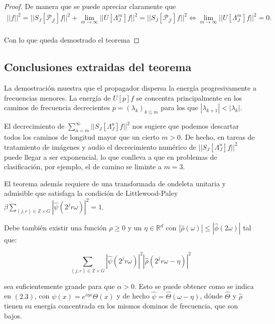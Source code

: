 \begin{proof}
  \noindent De manera que se puede apreciar claramente que  
  \begin{align*}
    ||f||^2 =||S_J[\mathcal{P_J}]f||^2 + \lim_{m\rightarrow \infty} ||U[\Lambda_J^m]f||^2  = ||S_J[\mathcal{P_J}]f||^2 \iff \lim_{m\rightarrow \infty} ||U[\Lambda_J^m]f||^2=0. \\
  \end{align*}

  \noindent Con lo que queda demostrado el teorema \qedhere
\end{proof}

\subsection{Conclusiones extraidas del teorema}
\noindent La demostración muestra que el propagador dispersa la energía progresivamente a frecuencias menores. La energía de $U[p]f$ se concentra principalmente en los caminos de frecuencia decrecientes $p=(\lambda_k)_{k\leq m}$ para los que $|\lambda_{k+1}|<|\lambda_k|$.


\medskip

\noindent El decrecimiento de $\sum_{n=m}^\infty || S_J[\Lambda_J^n]f||^2$ nos sugiere que podemos descartar todos los caminos de longitud mayor que un cierto $m>0$. De hecho, en tareas de tratamiento de imágenes y audio el decrecimiento numérico de $||S_J[\Lambda_J^n]f||^2$ puede llegar a ser exponencial, lo que conlleva a que en problemas de clasificación, por ejemplo, el de camino se liminte a $m=3$.

\medskip

\noindent El teorema además requiere de una transformada de ondeleta unitaria y admisible que satisfaga la condición de Littlewood-Paley $\beta \sum_{(j,r)\in \mathbb{Z}\times G}|\widehat{\psi}(2^jr\omega)|^2=1$. 

\medskip

\noindent Debe también existir una función $\rho \geq 0$ y un $\eta \in \mathbb{R}^d$ con $|\widehat{\rho}(\omega)|\leq |\widehat{\phi}(2\omega)|$ tal que: 

$$\sum_{(j,r)\in\mathbb{Z}\times G}|\widehat{\psi}(2^jr\omega)|^2|\widehat{\rho}(2^jr\omega-\eta)|^2$$

\noindent sea suficientemente grande para que $\alpha>0$. Esto se puede obtener como se indica en $(2.3)$, con $\psi(x)=e^{i\eta x}\Theta(x)$ y de hecho $\widehat{\psi}=\widehat{\Theta}(\omega-\eta)$, dónde $\widehat{\Theta}$ y $\widehat{\rho}$ tienen su energía concentrada en los mismos dominos de frecuencia, que son bajos.

\endinput